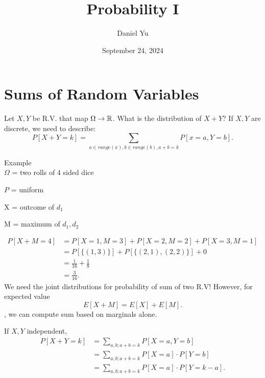 \documentclass[a4paper]{article}
\title{\Huge{Probability I}}
\author{\huge{Daniel Yu}}
\date{September 24, 2024}
\begin{document}
\maketitle
\newpage%
\tableofcontents
\pagebreak
\section{Sums of Random Variables}
\begin{definition}
 Let $X,Y$ be R.V. that map  $\Omega \to \mathbb{R}$. What is the distribution of 
$X+Y$? If $X,Y$ are discrete, we need to describe:
 \[
   P[X+Y =k] = \sum_{a \in range(x), b \in range(b), a + b =k} P[x=a,Y=b] 
.\]  
\end{definition}

\begin{note}{Example}\\
  $\Omega$ = two rolls of 4 sided dice

   $P$ = uniform

   X = outcome of $d_1$

   M = maximum of  $d_1,d_2$
 
   \begin{align*}
     P[X + M = 4] &= P[X=1, M=3] + P[X=2,M=2] + P[X=3, M=1] \\
                  &= P[\{(1,3)\}] + P[\{(2,1),(2,2)\}] + 0 \\
                  &= \frac{1}{16} + \frac{1}{8} \\
                  &= \frac{3}{16}
   .\end{align*}
   We need the joint distributions for probability of sum of two R.V! However, for expected value
   \[
     E[X+M] = E[X] + E[M]
   .\], we can compute sum  based on marginals alone.
\end{note}

\begin{definition}
  If $X,Y$ independent, 
   \begin{align*}
     P[X + Y = k] &= \sum_{a,b;a + b = k} P[X=a,Y=b] \\
                  &= \sum_{a,b; a+b=k} P[X=a] \cdot P[Y=b] \\
                  &= \sum_{a,b;a+b=k} P[X=a] \cdot P[Y = k-a]
  .\end{align*}
\end{definition}
\end{document}
